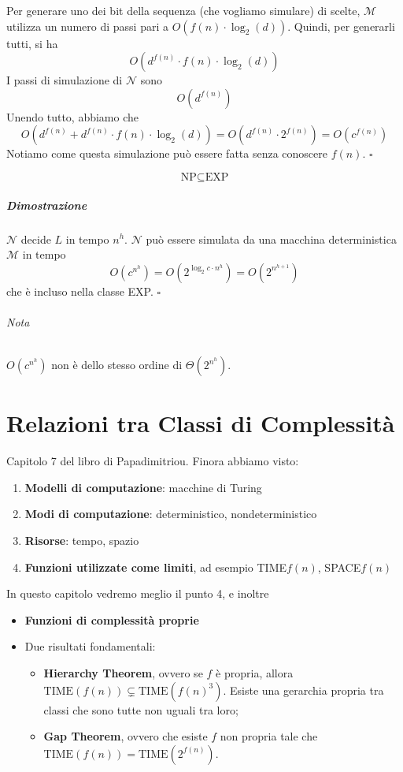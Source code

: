 Per generare uno dei bit della sequenza (che vogliamo simulare) di scelte, $\mathcal{M}$ utilizza un numero di passi pari a $O\left(f(n)\cdot\log_2(d)\right)$. Quindi, per generarli tutti, si ha
$$
    O\left(d^{f(n)}\cdot f(n)\cdot\log_2(d)\right)
$$
I passi di simulazione di $\mathcal{N}$ sono 
$$
    O\left(d^{f(n)}\right)
$$
Unendo tutto, abbiamo che
$$
    O\left(d^{f(n)} + d^{f(n)}\cdot f(n)\cdot\log_2(d)\right)= 
    O\left(d^{f(n)}\cdot 2^{f(n)}\right)=
    O\left(c^{f(n)}\right)
$$
Notiamo come questa simulazione può essere fatta senza conoscere $f(n)$. \hfill $\square$

\begin{corollary}
    $$
        \text{NP} \subseteq \text{EXP}
    $$
\end{corollary}
\paragraph{Dimostrazione} $\mathcal{N}$ decide $L$ in tempo $n^h$. $\mathcal{N}$ può essere simulata da una macchina deterministica $\mathcal{M}$ in tempo 
$$
    O\left(c^{n^h}\right) =
    O\left(2^{\log_2c\cdot n^h}\right) =
    O\left(2^{n^{h+1}}\right)
$$
che è incluso nella classe EXP. \hfill $\square$

\subparagraph{Nota} $O(c^{n^h})$ non è dello stesso ordine di $\Theta(2^{n^h})$.



\chapter{Relazioni tra Classi di Complessità}

Capitolo 7 del libro di Papadimitriou. Finora abbiamo visto:
\begin{enumerate}
    \item \textbf{Modelli di computazione}: macchine di Turing
    \item \textbf{Modi di computazione}: deterministico, nondeterministico
    \item \textbf{Risorse}: tempo, spazio
    \item \textbf{Funzioni utilizzate come limiti}, ad esempio TIME$f(n)$, SPACE$f(n)$
\end{enumerate}
In questo capitolo vedremo meglio il punto 4, e inoltre
\begin{itemize}
    \item \textbf{Funzioni di complessità proprie} 
    \item Due risultati fondamentali:
    \begin{itemize}
        \item \textbf{Hierarchy Theorem}, ovvero se $f$ è propria, allora $\text{TIME}(f(n))\subsetneq \text{TIME}(f(n)^3)$. Esiste una gerarchia propria tra classi che sono tutte non uguali tra loro;
        \item \textbf{Gap Theorem}, ovvero che esiste $f$ non propria tale che $\text{TIME}(f(n))=\text{TIME}(2^{f(n)})$.
    \end{itemize}
\end{itemize}


